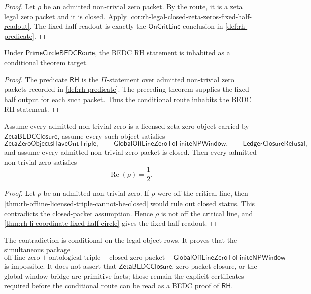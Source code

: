 \begin{proof}
Let $\rho$ be an admitted non-trivial zero packet.  By the route, it is
a zeta legal zero packet and it is closed.  Apply
\autoref{cor:rh-legal-closed-zeta-zeros-fixed-half-readout}.  The
fixed-half readout is exactly the $\mathsf{OnCritLine}$ conclusion in
\autoref{def:rh-predicate}.
\end{proof}

\begin{corollary}
\label{cor:rh-prime-circle-conditional-rh}
Under $\mathsf{PrimeCircleBEDCRoute}$, the BEDC RH statement is
inhabited as a conditional theorem target.
\end{corollary}

\begin{proof}
The predicate $\mathsf{RH}$ is the $\Pi$-statement over admitted
non-trivial zero packets recorded in \autoref{def:rh-predicate}.  The
preceding theorem supplies the fixed-half output for each such packet.
Thus the conditional route inhabits the BEDC RH statement.
\end{proof}

\begin{corollary}
\label{cor:rh-namecert-triple-conditional-rh}
Assume every admitted non-trivial zero is a licensed zeta zero object
carried by $\mathsf{ZetaBEDCClosure}$, assume every such object
satisfies
$$
\mathsf{ZetaZeroObjectsHaveOntTriple},
\qquad
\mathsf{GlobalOffLineZeroToFiniteNPWindow},
\qquad
\mathsf{LedgerClosureRefusal},
$$
and assume every admitted non-trivial zero packet is closed.  Then every
admitted non-trivial zero satisfies
$$
\operatorname{Re}(\rho)=\frac12.
$$
\end{corollary}

\begin{proof}
Let $\rho$ be an admitted non-trivial zero.  If $\rho$ were off the
critical line, then
\autoref{thm:rh-offline-licensed-triple-cannot-be-closed} would rule out
closed status.  This contradicts the closed-packet assumption.  Hence
$\rho$ is not off the critical line, and
\autoref{thm:rh-li-coordinate-fixed-half-circle} gives the fixed-half
readout.
\end{proof}

\begin{principle}
\label{prin:rh-prime-circle-contradiction-audit-boundary}
The contradiction is conditional on the legal-object rows.  It proves
that the simultaneous package
$$
\text{off-line zero}
+\text{ontological triple}
+\text{closed zero packet}
+\mathsf{GlobalOffLineZeroToFiniteNPWindow}
$$
is impossible.  It does not assert that $\mathsf{ZetaBEDCClosure}$,
zero-packet closure, or the global window bridge are primitive facts;
those remain the explicit certificates required before the conditional
route can be read as a BEDC proof of $\mathsf{RH}$.
\end{principle}

